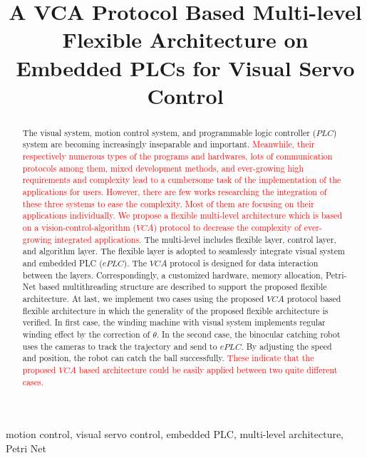 \documentclass[journal,UTF8]{IEEEtran}
\begin{document}
%
\title{A VCA Protocol Based Multi-level Flexible Architecture on Embedded PLCs for Visual Servo Control }

\maketitle

\begin{abstract}
The visual system, motion control system, and programmable logic controller ($PLC$) system are becoming increasingly inseparable and important. \textcolor{red}{Meanwhile, their respectively numerous types of the programs and hardwares, lots of communication protocols among them, mixed development methods, and ever-growing high requirements and complexity lead to a cumbersome task of the implementation of the applications for users. However, there are few works researching the integration of these three systems to ease the complexity. Most of them are focusing on their applications individually. We propose a flexible multi-level architecture which is based on a vision-control-algorithm ($VCA$) protocol to decrease the complexity of ever-growing integrated applications.} The multi-level includes flexible layer, control layer, and algorithm layer. The flexible layer is adopted to seamlessly integrate visual system and embedded PLC ($ePLC$). The $VCA$ protocol is designed for data interaction between the layers. Correspondingly, a customized hardware, memory allocation, Petri-Net based multithreading structure are described to support the proposed flexible architecture. At last, we implement two cases using the proposed $VCA$ protocol based flexible architecture in which the generality of the proposed flexible architecture is verified. In first case, the winding machine with visual system implements regular winding effect by the correction of $\theta$. In the second case, the binocular catching robot uses the cameras to track the trajectory and send to $ePLC$. By adjusting the speed and position, the robot can catch the ball successfully. \textcolor{red}{These indicate that the proposed $VCA$ based architecture could be easily applied between two quite different cases.}
\end{abstract}

\begin{IEEEkeywords}
motion control, visual servo control, embedded PLC, multi-level architecture, Petri Net
\end{IEEEkeywords}
\end{document}

